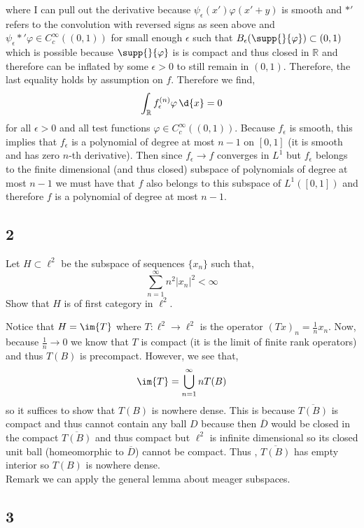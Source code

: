 \documentclass[12pt]{article}
\newcommand{\R}{\mathbb{R}}
\begin{document}
where I can pull out the derivative because $\psi_\epsilon(x') \varphi(x' + y)$ is smooth and $*'$ refers to the convolution with reversed signs as seen above and $\psi_\epsilon *' \varphi \in C^\infty_c((0,1))$ for small enough $\epsilon$ such that $B_\epsilon(\supp{}{\varphi}) \subset (0,1)$ which is possible because $\supp{}{\varphi}$ is is compact and thus closed in $\R$ and therefore can be inflated by some $\epsilon > 0$ to still remain in $(0,1)$. Therefore, the last equality holds by assumption on $f$. Therefore we find,
\[ \int_\R f_\epsilon^{(n)} \varphi \, \d{x} = 0 \]
for all $\epsilon > 0$ and all test functions $\varphi \in C^{\infty}_c((0,1))$. Because $f_\epsilon$ is smooth, this implies that $f_\epsilon$ is a polynomial of degree at most $n-1$ on $[0,1]$ (it is smooth and has zero $n$-th derivative). Then since $f_\epsilon \to f$ converges in $L^1$ but $f_\epsilon$ belongs to the finite dimensional (and thus closed) subspace of polynomials of degree at most $n-1$ we must have that $f$ also belongs to this subspace of $L^1([0,1])$ and therefore $f$ is a polynomial of degree at most $n-1$.


\subsection{2}

\begin{exercise}
Let $H \subset \ell^2$ be the subspace of sequences $\{ x_n \}$ such that,
\[ \sum_{n = 1}^\infty n^2 | x_n |^2 < \infty \]
Show that $H$ is of first category in $\ell^2$.
\end{exercise}

Notice that $H = \im{T}$ where $T : \ell^2 \to \ell^2$ is the operator $(T x)_n = \frac{1}{n} x_n$. Now, because $\frac{1}{n} \to 0$ we know that $T$ is compact (it is the limit of finite rank operators) and thus $T(B)$ is precompact. However, we see that,
\[ \im{T} = \bigcup_{n = 1}^\infty n T(B) \]
so it suffices to show that $T(B)$ is nowhere dense. This is because $\overline{T(B)}$ is compact and thus cannot contain any ball $D$ because then $\overline{D}$ would be closed in the compact $\overline{T(B)}$ and thus compact but $\ell^2$ is infinite dimensional so its closed unit ball (homeomorphic to $\overline{D}$) cannot be compact. Thus , $\overline{T(B)}$ has empty interior so $T(B)$ is nowhere dense. 
\bigskip\\
Remark we can apply the general lemma about meager subspaces.

\subsection{3}
\end{document}
